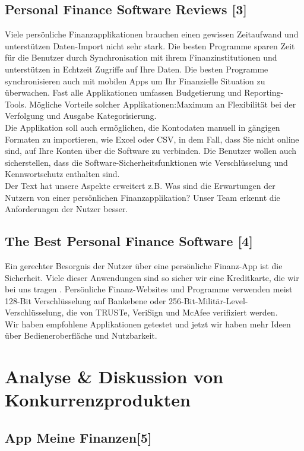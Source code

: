 \documentclass[runningheads,a4paper]{llncs}
\begin{document}
\subsection{Personal Finance Software Reviews [3]}
Viele persönliche  Finanzapplikationen brauchen einen gewissen Zeitaufwand und unterstützen Daten-Import nicht sehr stark. Die besten Programme sparen Zeit für die Benutzer durch  Synchronisation mit ihrem Finanzinstitutionen und unterstützen in Echtzeit Zugriffe auf Ihre Daten. Die besten Programme synchronisieren auch mit mobilen Apps um Ihr Finanzielle Situation zu überwachen. 
Fast alle Applikationen umfassen Budgetierung und Reporting-Tools. Mögliche Vorteile solcher Applikationen:Maximum an Flexibilität bei der Verfolgung und Ausgabe Kategorisierung. \\ Die Applikation soll auch ermöglichen, die Kontodaten manuell in gängigen Formaten zu importieren, wie Excel oder CSV, in dem Fall, dass Sie nicht online sind, auf Ihre Konten über die Software zu verbinden. Die 
Benutzer wollen auch sicherstellen, dass die Software-Sicherheitsfunktionen wie Verschlüsselung und Kennwortschutz enthalten sind.\\ Der Text hat unsere Aspekte erweitert z.B. Was sind die Erwartungen der Nutzern von einer persönlichen Finanzapplikation?  Unser Team erkennt die Anforderungen der Nutzer besser.  

\subsection{The Best Personal Finance Software [4]}
Ein gerechter Besorgnis  der Nutzer über eine persönliche Finanz-App ist die Sicherheit. Viele dieser Anwendungen sind so sicher wir eine Kreditkarte, die wir bei uns tragen . Persönliche Finanz-Websites und Programme verwenden meist 128-Bit Verschlüsselung auf Bankebene oder 256-Bit-Militär-Level-Verschlüsselung, die von TRUSTe, VeriSign und McAfee verifiziert werden. \\ Wir haben empfohlene Applikationen getestet und jetzt wir haben  mehr Ideen über Bedieneroberfläche und Nutzbarkeit. 
\clearpage

\section{Analyse \& Diskussion von Konkurrenzprodukten}
\subsection{App Meine Finanzen[5]}
\end{document}
